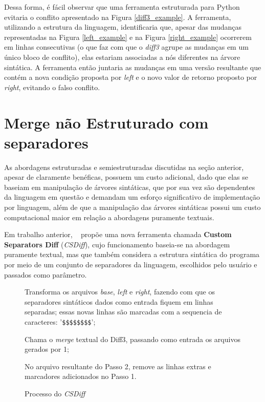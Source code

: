Dessa forma, é fácil observar que uma ferramenta estruturada para Python evitaria o
conflito apresentado na Figura \ref{diff3_example}. A ferramenta, utilizando a estrutura da
linguagem, identificaria que, apesar das mudanças representadas na Figura \ref{left_example} e na
Figura \ref{right_example} ocorrerem em linhas consecutivas (o que faz com que o \emph{diff3}
agrupe as mudanças em um único bloco de conflito),
elas estariam associadas a nós diferentes na árvore
sintática. A ferramenta então juntaria as mudanças em uma versão resultante que contém a
nova condição proposta por \emph{left} e o novo valor de retorno proposto por \emph{right},
evitando o falso conflito.

\section{Merge não Estruturado com separadores}
As abordagens estruturadas e semiestruturadas discutidas na seção anterior, apesar de claramente benéficas,
possuem um custo adicional, dado que elas se baseiam em manipulação de árvores sintáticas, que por sua vez são
dependentes da linguagem em questão e demandam um esforço significativo de implementação por linguagem, além de que
a manipulação das árvores sintáticas possui um custo computacional maior em relação a abordagens puramente textuais.

Em trabalho anterior, ~\citeauthor{clem21} propõe uma nova ferramenta chamada
\textbf{Custom Separators Diff} (\emph{CSDiff}), cujo funcionamento baseia-se na abordagem puramente textual, mas que também
considera a estrutura sintática do programa por meio de um conjunto de separadores da linguagem, escolhidos pelo usuário e
passados como parâmetro.

\begin{figure}[ht]
	\begin{center}
		\begin{compactenum}[1)]
			\item Transforma os arquivos \emph{base}, \emph{left} e \emph{right}, fazendo com que os separadores sintáticos
			dados como entrada fiquem em linhas separadas; essas novas linhas são marcadas com a sequencia de caracteres:
			'\verb|$$$$$$$$|';
			\item Chama o \emph{merge} textual do Diff3, passando como entrada os arquivos gerados por 1;
			\item No arquivo resultante do Passo 2, remove as linhas extras e marcadores adicionados no Passo 1.
		\end{compactenum}
	\end{center}
	\caption{Processo do \emph{CSDiff}}\label{csdiff_process}
\end{figure}


